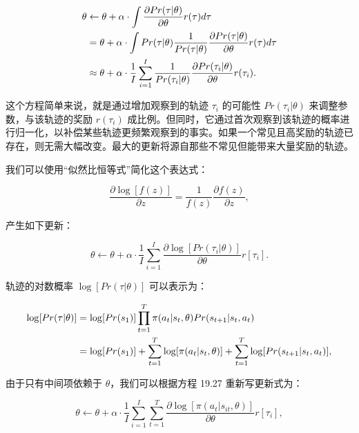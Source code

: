 \begin{align}
\theta &\leftarrow \theta + \alpha \cdot \int \frac{\partial Pr(\tau|\theta)}{\partial \theta} r(\tau) d\tau \notag\\
&= \theta + \alpha \cdot \int Pr(\tau|\theta) \frac{1}{Pr(\tau|\theta)} \frac{\partial Pr(\tau|\theta)}{\partial \theta} r(\tau) d\tau \notag\\
&\approx \theta + \alpha \cdot \frac{1}{I} \sum_{i=1}^I \frac{1}{Pr(\tau_i|\theta)} \frac{\partial Pr(\tau_i|\theta)}{\partial \theta} r(\tau_i). 
\end{align} 



这个方程简单来说，就是通过增加观察到的轨迹 \(\tau_i\) 的可能性 \(Pr(\tau_i|\theta)\) 来调整参数，与该轨迹的奖励 \(r(\tau_i)\) 成比例。但同时，它通过首次观察到该轨迹的概率进行归一化，以补偿某些轨迹更频繁观察到的事实。如果一个常见且高奖励的轨迹已存在，则无需大幅改变。最大的更新将源自那些不常见但能带来大量奖励的轨迹。

我们可以使用“似然比恒等式”简化这个表达式：

\begin{equation}
\frac{\partial \log[f(z)]}{\partial z} = \frac{1}{f(z)} \frac{\partial f(z)}{\partial z}, 
\end{equation}

产生如下更新：

\begin{equation}
\theta \leftarrow \theta + \alpha \cdot \frac{1}{I} \sum_{i=1}^{I} \frac{\partial \log [Pr(\tau_i|\theta)]}{\partial \theta} r[\tau_i]. 
\end{equation}

轨迹的对数概率 \(\log[Pr(\tau|\theta)]\) 可以表示为：


\begin{align}
\log[Pr(\tau|\theta)] &= \log [Pr(s_1)] \prod_{t=1}^{T} \pi(a_t|s_t, \theta) Pr(s_{t+1}|s_t, a_t) \notag\\
&= \log [Pr(s_1)] + \sum_{t=1}^{T} \log [\pi(a_t|s_t, \theta)] + \sum_{t=1}^{T} \log [Pr(s_{t+1}|s_t, a_t)], 
\end{align} 


由于只有中间项依赖于 \(\theta\)，我们可以根据方程 19.27 重新写更新式为：

\begin{equation}
\theta \leftarrow \theta + \alpha \cdot \frac{1}{I} \sum_{i=1}^{I} \sum_{t=1}^{T} \frac{\partial \log [\pi(a_t|s_{it}, \theta)]}{\partial \theta} r[\tau_i], 
\end{equation}

